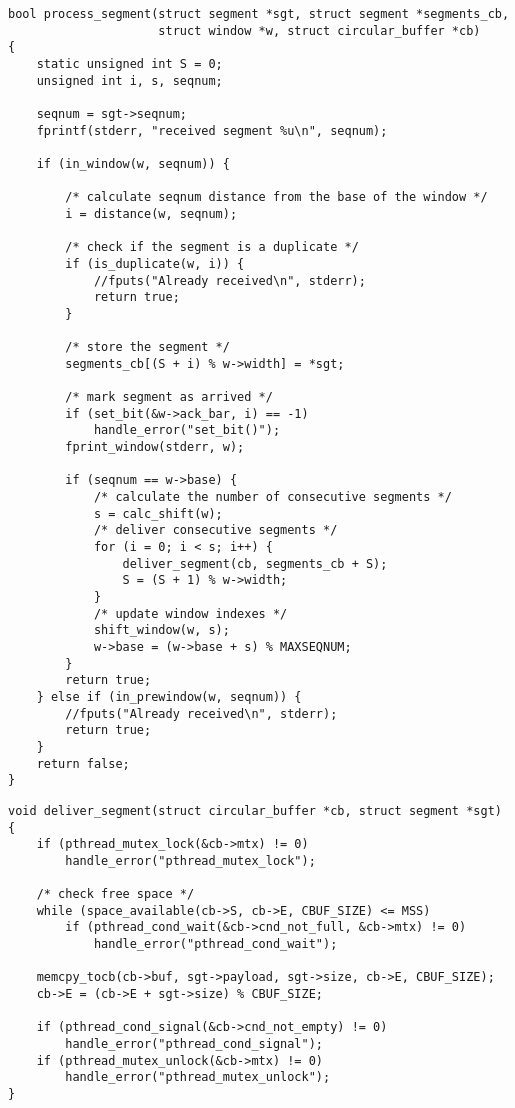 \begin{lstlisting}[title=transport.c]
bool process_segment(struct segment *sgt, struct segment *segments_cb,
                     struct window *w, struct circular_buffer *cb)
{
    static unsigned int S = 0;
    unsigned int i, s, seqnum;

    seqnum = sgt->seqnum;
    fprintf(stderr, "received segment %u\n", seqnum);

    if (in_window(w, seqnum)) {

        /* calculate seqnum distance from the base of the window */
        i = distance(w, seqnum);

        /* check if the segment is a duplicate */
        if (is_duplicate(w, i)) {
            //fputs("Already received\n", stderr);
            return true;
        }

        /* store the segment */
        segments_cb[(S + i) % w->width] = *sgt;

        /* mark segment as arrived */
        if (set_bit(&w->ack_bar, i) == -1)
            handle_error("set_bit()");
        fprint_window(stderr, w);

        if (seqnum == w->base) {
            /* calculate the number of consecutive segments */
            s = calc_shift(w);
            /* deliver consecutive segments */
            for (i = 0; i < s; i++) {
                deliver_segment(cb, segments_cb + S);
                S = (S + 1) % w->width;
            }
            /* update window indexes */
            shift_window(w, s);
            w->base = (w->base + s) % MAXSEQNUM;
        }
        return true;
    } else if (in_prewindow(w, seqnum)) {
        //fputs("Already received\n", stderr);
        return true;
    }
    return false;
}
\end{lstlisting}

\begin{lstlisting}[title=transport.c]
void deliver_segment(struct circular_buffer *cb, struct segment *sgt)
{
    if (pthread_mutex_lock(&cb->mtx) != 0)
        handle_error("pthread_mutex_lock");

    /* check free space */
    while (space_available(cb->S, cb->E, CBUF_SIZE) <= MSS) 
        if (pthread_cond_wait(&cb->cnd_not_full, &cb->mtx) != 0)
            handle_error("pthread_cond_wait");

    memcpy_tocb(cb->buf, sgt->payload, sgt->size, cb->E, CBUF_SIZE);
    cb->E = (cb->E + sgt->size) % CBUF_SIZE;

    if (pthread_cond_signal(&cb->cnd_not_empty) != 0)
        handle_error("pthread_cond_signal");
    if (pthread_mutex_unlock(&cb->mtx) != 0)
        handle_error("pthread_mutex_unlock");
}
\end{lstlisting}
